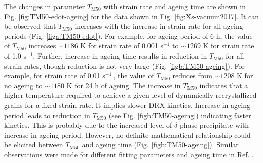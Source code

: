 \documentclass[a4paper, 11pt, dvipsnames]{article}
\begin{document}
The changes in parameter $T_{\text{M50}}$ with strain rate and ageing time are shown in Fig. \ref{fig:TM50-edot-ageing} for the data shown in Fig. \ref{fig:Xs-vacuum2017}. It can be observed that $T_{\text{M50}}$ increases with the increase in strain rate for all ageing periods (Fig. \ref{figa:TM50-edot}). For example, for ageing period of 6 h, the value of $T_{\text{M50}}$ increases $\sim 1186$ K for strain rate of 0.001 s$^{-1}$ to $\sim 1269$ K for strain rate of 1.0 s$^{-1}$. Further, increase in ageing time results in reduction in $T_{\text{M50}}$ for all strain rates, though reduction is not very large (Fig. \ref{figb:TM50-ageing}). For example, for strain rate of 0.01 s$^{-1}\,$, the value of $T_{\text{M50}}$ reduces from $\sim 1208$ K for no ageing to $\sim 1180$ K for 24 h of ageing. The increase in $T_{\text{M50}}$ indicates that a higher temperature required to achieve a given level of dynamically recrystallized grains for a fixed strain rate. It implies slower DRX kinetics. Increase in ageing period leads to reduction in $T_{\text{M50}}$ (see Fig. \ref{figb:TM50-ageing}) indicating faster kinetics. This is probably due to the increased level of $\delta$-phase precipitate with increase in ageing period. However, no definite mathematical relationship could be elicited between $T_{\text{M50}}$ and ageing time (Fig. \ref{figb:TM50-ageing}). Similar observations were made for different fitting parameters and ageing time in Ref. \cite{X1}.
\end{document}
